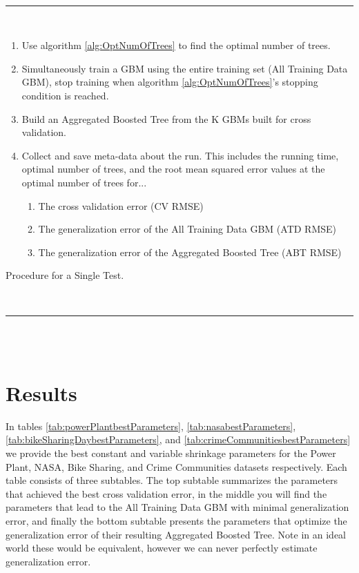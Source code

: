 \documentclass[9pt, conference]{IEEEtran}
\begin{document}
\begin{algorithm}[]
	\hspace{1 mm} \\\hrule\hspace{1 mm} \\
	\begin{enumerate}
		\item Use algorithm \ref{alg:OptNumOfTrees} to find the optimal number of trees. 
		\item Simultaneously train a GBM using the entire training set (All Training Data GBM), stop training when algorithm \ref{alg:OptNumOfTrees}'s stopping condition is reached.
		\item Build an Aggregated Boosted Tree from the K GBMs built for cross validation.
		\item Collect and save meta-data about the run. This includes the running time, optimal number of trees, and the root mean squared error values at the optimal number of trees for...
		\begin{enumerate}
			\item The cross validation error (CV RMSE)
			\item The generalization error of the All Training Data GBM (ATD RMSE)
			\item The generalization error of the Aggregated Boosted Tree (ABT RMSE)
		\end{enumerate}
	\end{enumerate}
	\caption{Procedure for a Single Test.}
	\hspace{1 mm} \\\hrule\hspace{1 mm} \\\hspace{1 mm} \\
	\label{alg:tuningProcedure}
\end{algorithm}%

\begin{figure}[!t]

\end{figure}
\section{Results}
\label{sec:results}

In tables \ref{tab:powerPlantbestParameters}, \ref{tab:nasabestParameters}, \ref{tab:bikeSharingDaybestParameters}, and \ref{tab:crimeCommunitiesbestParameters} we provide the best constant and variable shrinkage parameters for the Power Plant, NASA, Bike Sharing, and Crime Communities datasets respectively. Each table consists of three subtables. The top subtable summarizes the parameters that achieved the best cross validation error, in the middle you will find the parameters that lead to the All Training Data GBM with minimal generalization error, and finally the bottom subtable presents the parameters that optimize the generalization error of their resulting Aggregated Boosted Tree. Note in an ideal world these would be equivalent, however we can never perfectly estimate generalization error.
\end{document}
